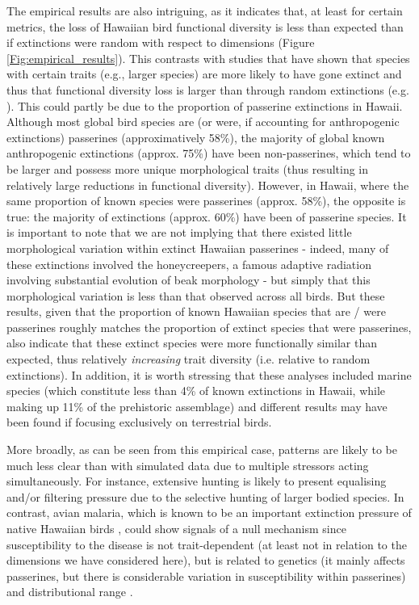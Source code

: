 \documentclass[12pt,letterpaper]{article}
\begin{document}
The empirical results are also intriguing, as it indicates that, at least for certain metrics, the loss of Hawaiian bird functional diversity is less than expected than if extinctions were random with respect to dimensions (Figure \ref{Fig:empirical_results}).
This contrasts with studies that have shown that species with certain traits (e.g., larger species) are more likely to have gone extinct and thus that functional diversity loss is larger than through random extinctions (e.g. \citealt{sayol2021loss,Matthews2022}).
This could partly be due to the proportion of passerine extinctions in Hawaii.
Although most global bird species are (or were, if accounting for anthropogenic extinctions) passerines (approximatively 58\%), the majority of global known anthropogenic extinctions (approx. 75\%) have been non-passerines, which tend to be larger and possess more unique morphological traits (thus resulting in relatively large reductions in functional diversity).
However, in Hawaii, where the same proportion of known species were passerines (approx. 58\%), the opposite is true: the majority of extinctions (approx. 60\%) have been of passerine species.
It is important to note that we are not implying that there existed little morphological variation within extinct Hawaiian passerines - indeed, many of these extinctions involved the honeycreepers, a famous adaptive radiation involving substantial evolution of beak morphology \citep{Walther2022} - but simply that this morphological variation is less than that observed across all birds.
But these results, given that the proportion of known Hawaiian species that are / were passerines roughly matches the proportion of extinct species that were passerines,  also indicate that these extinct species were more functionally similar than expected, thus relatively \textit{increasing} trait diversity (i.e. relative to random extinctions).
In addition, it is worth stressing that these analyses included marine species (which constitute less than 4\% of  known extinctions in Hawaii, while making up 11\% of the prehistoric assemblage) and different results may have been found if focusing exclusively on terrestrial birds.

More broadly, as can be seen from this empirical case, patterns are likely to be much less clear than with simulated data due to multiple stressors acting simultaneously.
For instance, extensive hunting is likely to present equalising and/or filtering pressure due to the selective hunting of larger bodied species.
In contrast, avian malaria, which is known to be an important extinction pressure of native Hawaiian birds \citep{samuel2011dynamics}, could show signals of a null mechanism since susceptibility to the disease is not trait-dependent (at least not in relation to the dimensions we have considered here), but is related to genetics (it mainly affects passerines, but there is considerable variation in susceptibility within passerines) and distributional range \citep{jessup2023wildlife}.
\end{document}
